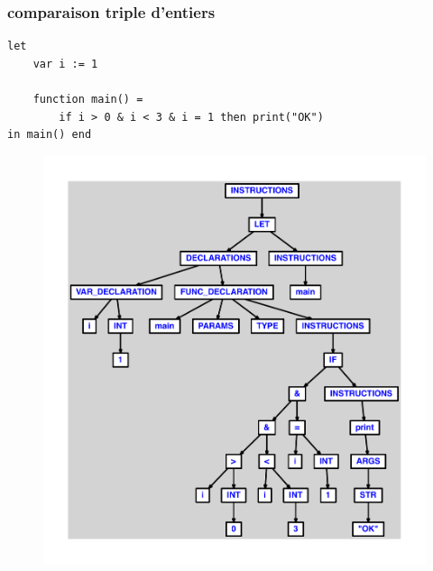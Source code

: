 \documentclass{article}
\begin{document}
\subsubsection{comparaison triple d'entiers}
\begin{lstlisting}
let
	var i := 1

	function main() =
		if i > 0 & i < 3 & i = 1 then print("OK")
in main() end
\end{lstlisting}
\newpage
\begin{figure}[H]
\centering
\includegraphics[max width=\textwidth]{ast/ast_174.pdf}
\end{figure}
\newpage
\end{document}
